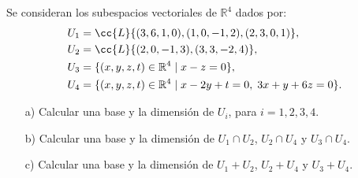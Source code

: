 \begin{ejercicio}
	Se consideran los subespacios vectoriales de \( \mathbb{R}^4 \) dados por:
	\[
		\begin{aligned}
			U_1 & = \cc{L}\{(3,6,1,0), (1,0,-1,2), (2,3,0,1)\},                            \\
			U_2 & = \cc{L}\{(2,0,-1,3), (3,3,-2,4)\},                                      \\
			U_3 & = \{(x,y,z,t) \in \mathbb{R}^4 \mid x - z = 0\},                         \\
			U_4 & = \{(x,y,z,t) \in \mathbb{R}^4 \mid x - 2y + t = 0, \; 3x + y + 6z= 0\}.
		\end{aligned}
	\]

	\begin{enumerate}
		\item[a)] Calcular una base y la dimensión de \( U_i \), para \( i = 1, 2, 3, 4 \).
		\item[b)] Calcular una base y la dimensión de \( U_1 \cap U_2 \), \( U_2 \cap U_4 \) y \( U_3 \cap U_4 \).
		\item[c)] Calcular una base y la dimensión de \( U_1 + U_2 \), \( U_2 + U_4 \) y \( U_3 + U_4 \).
	\end{enumerate}


\end{ejercicio}
